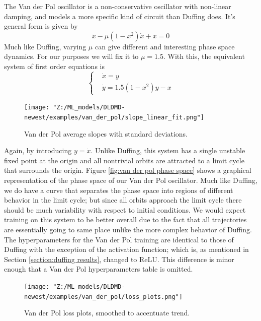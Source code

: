 The Van der Pol oscillator is a non-conservative oscillator with non-linear damping, and models a more 
specific kind of circuit than Duffing does. It's general form is given by 
\begin{equation}
    \ddot{x} - \mu(1 - x^2)\dot{x} + x = 0
\end{equation}
Much like Duffing, varying $\mu$ can give different and interesting phase space dynamics. For our
purposes we will fix it to $\mu = 1.5$. With this, the equivalent system of first order equations
is 
\begin{equation}
    \begin{cases}
        & \dot{x} = y \\
        & \dot{y} = 1.5(1 - x^2)y - x  
    \end{cases}
\end{equation}

\begin{figure}[ht]
    \centering
    \begin{minipage}{\textwidth}
        \texttt{[image: "Z:/ML\_models/DLDMD-newest/examples/van\_der\_pol/slope\_linear\_fit.png"]} 
    \end{minipage}
    \caption{Van der Pol average slopes with standard deviations.}
    \label{fig:van der pol average slopes}
\end{figure}

Again, by introducing $y = \dot{x}$. Unlike Duffing, this system has a single unstable fixed point
at the origin and all nontrivial orbits are attracted to a limit cycle that surrounds the origin. 
Figure \ref{fig:van der pol phase space} shows a graphical representation of the phase space of our 
Van der Pol oscillator. Much like Duffing, we do have a curve that separates the phase space into 
regions of different behavior in the limit cycle; but since all orbits approach the limit cycle there
should be much variability with respect to initial conditions. We would expect training on this system 
to be better overall due to the fact that all trajectories are essentially going to same place unlike
the more complex behavior of Duffing. The hyperparameters for the Van der Pol
training are identical to those of Duffing with the exception of the activation function; which is, 
as mentioned in Section \ref{section:duffing results}, changed to ReLU. This difference 
is minor enough that a Van der Pol hyperparameters table is omitted.

\begin{figure}[ht]
    \centering
    \begin{minipage}{\textwidth}
        \texttt{[image: "Z:/ML\_models/DLDMD-newest/examples/van\_der\_pol/loss\_plots.png"]} 
    \end{minipage}
    \caption{Van der Pol loss plots, smoothed to accentuate trend.}
    \label{fig:van der pol losses}
\end{figure}

